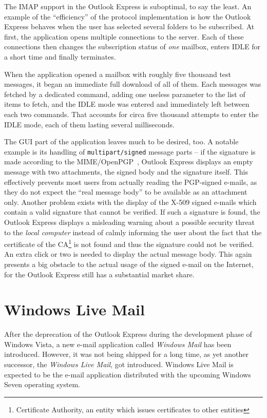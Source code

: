 \documentclass[12pt,notitlepage]{report}
\begin{document}
The IMAP support in the Outlook Express is suboptimal, to say the least.  An
example of the ``efficiency'' of the protocol implementation is how the Outlook
Express behaves when the user has selected several folders to be subscribed.  At
first, the application opens multiple connections to the server.  Each of these
connections then changes the subscription status of {\em one} mailbox, enters
IDLE for a short time and finally terminates.

When the application opened a mailbox with roughly five thousand test messages,
it began an immediate full download of all of them.  Each messages was fetched
by a dedicated command, adding one useless parameter to the list of items to
fetch, and the IDLE mode was entered and immediately left between each two
commands.  That accounts for circa five thousand attempts to enter the IDLE
mode, each of them lasting several milliseconds.

The GUI part of the application leaves much to be desired, too.  A notable
example is its handling of {\tt multipart/signed} message parts -- if the
signature is made according to the MIME/OpenPGP~\cite{rfc-mime-openpgp}, Outlook
Express displays an empty message with two attachments, the signed body and the
signature itself.  This effectively prevents most users from actually reading
the PGP-signed e-mails, as they do not expect the ``real message body'' to be
available as an attachment only.  Another problem exists with the display of the
X-509 signed e-mails which contain a valid signature that cannot be verified.
If such a signature is found, the Outlook Express displays a misleading warning
about a possible security threat to the {\em local computer} instead of calmly
informing the user about the fact that the certificate of the
CA\footnote{Certificate Authority, an entity which issues certificates to other
entities} is not found and thus the signature could not be verified.  An extra
click or two is needed to display the actual message body.  This again presents
a big obstacle to the actual usage of the signed e-mail on the Internet, for the
Outlook Express still has a substantial market share.

\section{Windows Live Mail}

After the deprecation of the Outlook Express during the development phase of
Windows Vista, a new e-mail application called {\em Windows Mail} has been
introduced.  However, it was not being shipped for a long time, as yet another
successor, the {\em Windows Live Mail}, got introduced.  Windows Live Mail is
expected to be the e-mail application distributed with the upcoming Windows
Seven operating system.
\end{document}
